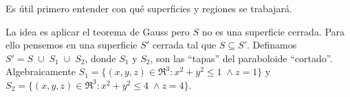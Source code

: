 \newpage
\begin{solution}
    Es \'util primero entender con qu\'e superficies y regiones se trabajar\'a.

    \begin{center}
    \end{center}

    La idea es aplicar el teorema de Gauss pero  $S$ no es una superficie cerrada.   Para ello pensemos en una superficie $S'$  cerrada tal  que $S \subseteq S'.$  Definamos   $S'=S\;\cup\;S_1\;\cup\;S_2$,  donde $S_1$ y $S_2$, son las ``tapas'' del paraboloide ``cortado''.  Algebraicamente $S_1=\{(x,y,z)\in \Re^3 : x^2+y^2\le 1\;\land z=1\}$ y $S_2=\{(x,y,z)\in \Re^3 : x^2+y^2\le4\;\land z=4\}$.


\end{solution}
